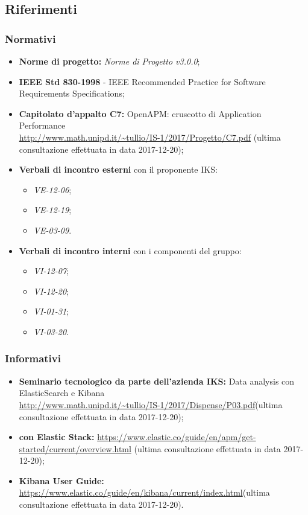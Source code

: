 	\subsection{Riferimenti}
	\subsubsection{Normativi}
	\begin{itemize}
		\item \textbf{Norme di progetto:} \emph{Norme di Progetto v3.0.0};
		\item \textbf{IEEE Std 830-1998} - IEEE Recommended Practice for Software Requirements Specifications;
		\item \textbf{Capitolato d'appalto C7:} OpenAPM: cruscotto di Application Performance  \\ \url{http://www.math.unipd.it/~tullio/IS-1/2017/Progetto/C7.pdf} (ultima consultazione effettuata in data 2017-12-20);
		\item \textbf{Verbali di incontro esterni} con il proponente IKS: \begin{itemize}
			\item \emph{VE-12-06};
			\item \emph{VE-12-19};
			\item \emph{VE-03-09}.
		\end{itemize}
		\item \textbf{Verbali di incontro interni} con i componenti del gruppo:
		\begin{itemize}
			\item \emph{VI-12-07};
			\item \emph{VI-12-20};
			\item \emph{VI-01-31};
			\item \emph{VI-03-20}.
		\end{itemize}
	\end{itemize}
	
	\subsubsection{Informativi}
	\begin{itemize}
		\item \textbf{Seminario tecnologico da parte dell'azienda IKS:} Data analysis con ElasticSearch e Kibana \\ \url{http://www.math.unipd.it/~tullio/IS-1/2017/Dispense/P03.pdf}(ultima consultazione effettuata in data 2017-12-20);
		\item \textbf{ con Elastic Stack:} \url{https://www.elastic.co/guide/en/apm/get-started/current/overview.html} (ultima consultazione effettuata in data 2017-12-20);
		\item \textbf{Kibana User Guide:} \url{https://www.elastic.co/guide/en/kibana/current/index.html}(ultima consultazione effettuata in data 2017-12-20).
	
	\end{itemize}
	